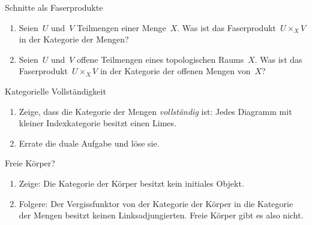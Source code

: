 \documentclass{uebblatt}
\begin{document}
\begin{aufgabe}{Schnitte als Faserprodukte}
\begin{enumerate}
\item Seien~$U$ und~$V$ Teilmengen einer Menge~$X$. Was ist das Faserprodukt~$U
\times_X V$ in der Kategorie der Mengen?
\item Seien~$U$ und~$V$ offene Teilmengen eines topologischen Raums~$X$. Was
ist das Faserprodukt~$U \times_X V$ in der Kategorie der offenen Mengen
von~$X$?
\end{enumerate}
\end{aufgabe}

\begin{aufgabe}{Kategorielle Vollständigkeit}
\begin{enumerate}
\item Zeige, dass die Kategorie der Mengen \emph{vollständig} ist: Jedes Diagramm
mit kleiner Indexkategorie besitzt einen Limes.
\item Errate die duale Aufgabe und löse sie.
\end{enumerate}
\end{aufgabe}

\begin{aufgabe}{Freie Körper?}
\begin{enumerate}
\item Zeige: Die Kategorie der Körper besitzt kein initiales Objekt.
\item Folgere: Der Vergissfunktor von der Kategorie der Körper in die Kategorie
der Mengen besitzt keinen Linksadjungierten. Freie Körper gibt es also nicht.
\end{enumerate}
\end{aufgabe}
\end{document}
